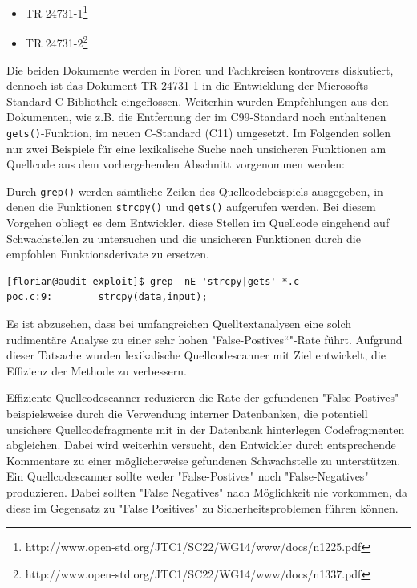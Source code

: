 \begin{itemize}
      \item TR 24731-1\footnote{http://www.open-std.org/JTC1/SC22/WG14/www/docs/n1225.pdf}    
      \item TR 24731-2\footnote{http://www.open-std.org/JTC1/SC22/WG14/www/docs/n1337.pdf}
\end{itemize}
	
Die beiden Dokumente werden in Foren und Fachkreisen kontrovers diskutiert, dennoch ist das Dokument TR 24731-1 in die Entwicklung der Microsofts Standard-C Bibliothek eingeflossen. Weiterhin wurden Empfehlungen aus den Dokumenten, wie z.B. die Entfernung der im C99-Standard noch enthaltenen \texttt{gets()}-Funktion, im neuen C-Standard (C11) umgesetzt.
Im Folgenden sollen nur zwei Beispiele für eine lexikalische Suche nach unsicheren Funktionen am Quellcode aus dem vorhergehenden Abschnitt vorgenommen werden:
\par\medskip 
Durch \texttt{grep()} werden sämtliche Zeilen des Quellcodebeispiels ausgegeben, in denen die Funktionen \texttt{strcpy()} und \texttt{gets()} aufgerufen werden. Bei diesem Vorgehen obliegt es dem Entwickler, diese Stellen im Quellcode eingehend auf Schwachstellen zu untersuchen und die unsicheren Funktionen durch die empfohlen Funktionsderivate zu ersetzen.

\begin{lstlisting}[basicstyle=\ttfamily\footnotesize]
[florian@audit exploit]$ grep -nE 'strcpy|gets' *.c
poc.c:9:        strcpy(data,input);
\end{lstlisting}

Es ist abzusehen, dass bei umfangreichen Quelltextanalysen eine solch rudimentäre Analyse zu einer sehr hohen "False-Postives“"-Rate führt. Aufgrund dieser Tatsache wurden lexikalische Quellcodescanner mit Ziel entwickelt, die Effizienz der Methode zu verbessern.

Effiziente Quellcodescanner reduzieren die Rate der gefundenen "False-Postives" beispielsweise durch die Verwendung interner Datenbanken, die  potentiell unsichere Quellcodefragmente mit in der Datenbank hinterlegen Codefragmenten abgleichen. Dabei wird weiterhin versucht, den Entwickler durch entsprechende Kommentare zu einer möglicherweise gefundenen Schwachstelle zu unterstützen. Ein Quellcodescanner sollte weder "False-Postives" noch "False-Negatives" produzieren. Dabei sollten "False Negatives" nach Möglichkeit nie vorkommen, da diese im Gegensatz zu "False Positives" zu Sicherheitsproblemen führen können.

